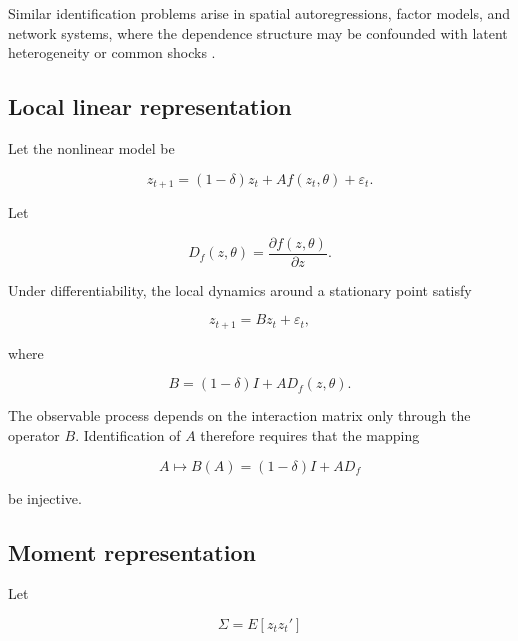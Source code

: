 \documentclass[12pt]{article}
\numberwithin{equation}{section}
\begin{document}
Similar identification problems arise in spatial autoregressions,
factor models, and network systems, where the dependence structure may be
confounded with latent heterogeneity or common shocks
\citep{manski1993identification, anselin1988spatial, bai2009panel,
graham2017econometrics, acemoglu2012network}.

\subsection{Local linear representation}

Let the nonlinear model be

\begin{equation}
z_{t+1}
=
(1-\delta) z_t
+
A f(z_t,\theta)
+
\varepsilon_t.
\label{eq:4.model}
\end{equation}

Let

\begin{equation}
D_f(z,\theta)
=
\frac{\partial f(z,\theta)}{\partial z}.
\label{eq:4.jacobian}
\end{equation}

Under differentiability, the local dynamics around a stationary point satisfy

\begin{equation}
z_{t+1}
=
B z_t
+
\varepsilon_t,
\label{eq:4.linear}
\end{equation}

where

\begin{equation}
B
=
(1-\delta) I
+
A D_f(z,\theta).
\label{eq:4.operator}
\end{equation}

The observable process depends on the interaction matrix only through the
operator $B$. Identification of $A$ therefore requires that the mapping

\begin{equation}
A
\mapsto
B(A)
=
(1-\delta) I + A D_f
\label{eq:4.mapping}
\end{equation}

be injective.

\subsection{Moment representation}

Let

\begin{equation}
\Sigma
=
E[z_t z_t']
\label{eq:4.sigma}
\end{equation}
\end{document}
